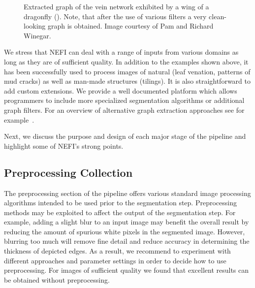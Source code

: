 	\begin{figure}
	\centering
	\caption[\A: Output of NEFI]{Extracted graph of the vein network exhibited by a wing of a dragonfly (\A). Note, that after the use of various filters a very clean-looking graph is obtained. Image courtesy of Pam and Richard Winegar.}
	\label{fig:dragonlfy}
	\end{figure}


	We stress that NEFI can deal with a range of inputs from various domains as long as they are of sufficient quality. In addition to the examples shown above, it has been successfully used to process images of natural (\eg leaf venation, patterns of mud cracks) as well as man-made structures (tilings). It is also straightforward to add custom extensions. We provide a well documented platform which allows programmers to include more specialized segmentation algorithms or additional graph filters. For an overview of alternative graph extraction approaches see for example~\cite{dehkordi2011review}.

	Next, we discuss the purpose and design of each major stage of the pipeline and highlight some of NEFI's strong points.


	\subsection{Preprocessing Collection}

		The preprocessing section of the pipeline offers various standard image processing algorithms intended to be used prior to the segmentation step. Preprocessing methods may be exploited to affect the output of the segmentation step. For example, adding a slight blur to an input image may benefit the overall result by reducing the amount of spurious white pixels in the segmented image. However, blurring too much will remove fine detail and reduce accuracy in determining the thickness of depicted edges. As a result, we recommend to experiment with different approaches and parameter settings in order to decide how to use preprocessing. For images of sufficient quality we found that excellent results can be obtained without preprocessing. 

